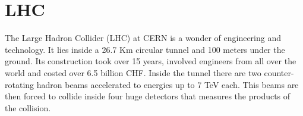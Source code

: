 
\chapter{LHC} %

\label{ch:LHC} %


The Large Hadron Collider (LHC) at CERN is a wonder of engineering and technology. It lies inside a 26.7 Km circular tunnel and 100 meters under the ground. Its construction took over 15 years, involved engineers from all over the world and costed over 6.5 billion CHF. Inside the tunnel there are two counter-rotating hadron beams accelerated to energies up to 7 TeV each. This beams are then forced to collide inside four huge detectors that measures the products of the collision\citep{LHCMT}.
